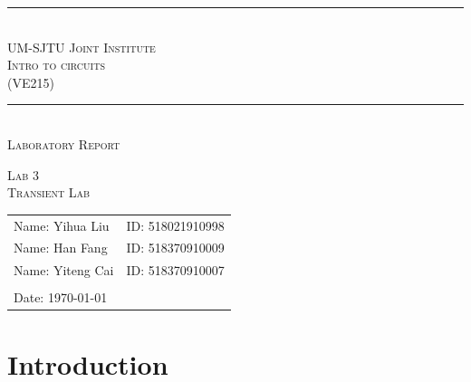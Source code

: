 \documentclass[a4paper]{report}
\begin{document}
	\renewcommand\thesection{\arabic{section}}
	\begin{Large}
		\begin{center}
			\setlength{\baselineskip}{14pt}
			\vspace{1.25cm}
			\rule[0cm]{11.2cm}{0.03em}\\
			\vspace{0.5cm}
			\textsc{UM-SJTU Joint Institute}\\
			\vspace{0.25cm}
			\textsc{Intro to circuits\\(VE215)}
			\vspace{0.3cm}
			\rule[0cm]{11.8cm}{0.05em}
			\vspace{4.9cm}\\
			\textsc{Laboratory Report}
		\end{center}
	\end{Large}
	\vspace{0.85cm}
	\begin{large}
		\begin{center}
			\textsc{Lab 3}
			\vspace{1em}\\
			\textsc{Transient Lab}
		\end{center}
		\vspace{6cm}
	\end{large}
	\begin{tabular}{l l}
	Name: Yihua Liu&ID: 518021910998\\
	Name: Han Fang&ID: 518370910009\\
	Name: Yiteng Cai&ID: 518370910007\\
	&\\
	Date: \today&\\
	\end{tabular}
	\thispagestyle{empty}
	\newpage
	\section{Introduction}
\end{document}

